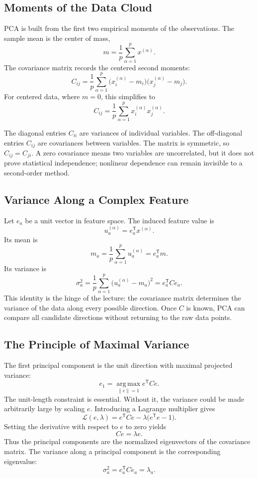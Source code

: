 \subsection{Moments of the Data Cloud}

PCA is built from the first two empirical moments of the observations. The sample mean is the center of mass,
\[
  m = \frac{1}{p}\sum_{\alpha=1}^{p} x^{(\alpha)}.
\]
The covariance matrix records the centered second moments:
\[
  C_{ij}
  =
  \frac{1}{p}\sum_{\alpha=1}^{p}
  \bigl(x_i^{(\alpha)} - m_i\bigr)
  \bigl(x_j^{(\alpha)} - m_j\bigr).
\]
For centered data, where $m=0$, this simplifies to
\[
  C_{ij}
  =
  \frac{1}{p}\sum_{\alpha=1}^{p}
  x_i^{(\alpha)}x_j^{(\alpha)}.
\]

The diagonal entries $C_{ii}$ are variances of individual variables. The off-diagonal entries $C_{ij}$ are covariances between variables. The matrix is symmetric, so $C_{ij}=C_{ji}$. A zero covariance means two variables are uncorrelated, but it does not prove statistical independence; nonlinear dependence can remain invisible to a second-order method.

\subsection{Variance Along a Complex Feature}

Let $e_a$ be a unit vector in feature space. The induced feature value is
\[
  u_a^{(\alpha)} = e_a^{\mathsf{T}}x^{(\alpha)}.
\]
Its mean is
\[
  m_a
  =
  \frac{1}{p}\sum_{\alpha=1}^{p}u_a^{(\alpha)}
  =
  e_a^{\mathsf{T}}m.
\]
Its variance is
\[
  \sigma_a^2
  =
  \frac{1}{p}\sum_{\alpha=1}^{p}
  \bigl(u_a^{(\alpha)} - m_a\bigr)^2
  =
  e_a^{\mathsf{T}} C e_a.
\]
This identity is the hinge of the lecture: the covariance matrix determines the variance of the data along every possible direction. Once $C$ is known, PCA can compare all candidate directions without returning to the raw data points.

\subsection{The Principle of Maximal Variance}

The first principal component is the unit direction with maximal projected variance:
\[
  e_1
  =
  \operatorname*{arg\,max}_{\|e\|=1} e^{\mathsf{T}}Ce.
\]
The unit-length constraint is essential. Without it, the variance could be made arbitrarily large by scaling $e$. Introducing a Lagrange multiplier gives
\[
  \mathcal{L}(e,\lambda)
  =
  e^{\mathsf{T}}Ce
  -
  \lambda\bigl(e^{\mathsf{T}}e - 1\bigr).
\]
Setting the derivative with respect to $e$ to zero yields
\[
  Ce = \lambda e.
\]
Thus the principal components are the normalized eigenvectors of the covariance matrix. The variance along a principal component is the corresponding eigenvalue:
\[
  \sigma_a^2 = e_a^{\mathsf{T}}Ce_a = \lambda_a.
\]

